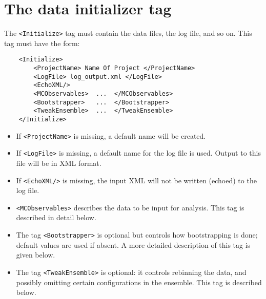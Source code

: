 \documentclass[12pt]{article}
\newcommand{\vb}{\texttt}
\begin{document}
\section{The data initializer tag}
The \vb{<Initialize>} tag must contain the data files, the log file, and so on. 
This tag must have the form:
\begin{verbatim}
    <Initialize>
        <ProjectName> Name Of Project </ProjectName>
        <LogFile> log_output.xml </LogFile>
        <EchoXML/>
        <MCObservables>  ...  </MCObservables>
        <Bootstrapper>   ...  </Bootstrapper>
        <TweakEnsemble>  ...  </TweakEnsemble>
    </Initialize>
\end{verbatim}
\begin{itemize} 
\item                                                 
 If \vb{<ProjectName>} is missing, a default name will be created.
\item                                                                   
 If \vb{<LogFile>} is missing, a default name for the log file is used. 
Output to this file will be in XML format.
\item                                                              
 If \vb{<EchoXML/>} is missing, the input XML will not be written (echoed)
 to the log file.                                                          
\item                                                                   
 \vb{<MCObservables>} describes the data to be input for analysis. This
 tag is described in detail below.       
\item                                                                   
 The tag \vb{<Bootstrapper>} is optional but controls how bootstrapping 
     is done; default values are used if absent.  A more detailed 
 description of this tag is given below.    
\item                                                                   
 The tag \vb{<TweakEnsemble>} is optional: it controls rebinning the    
     data, and possibly omitting certain configurations in the          
     ensemble.  This tag is described below.  
\end{itemize}                                                                    
\end{document}
